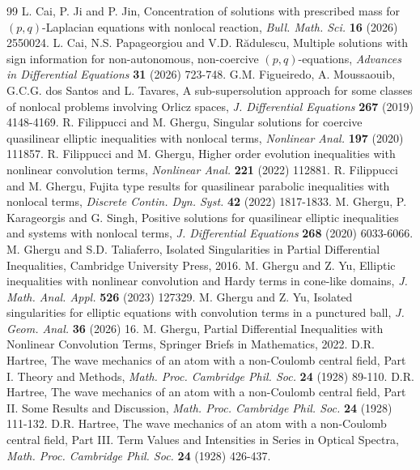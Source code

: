 \documentclass[10pt,a4paper]{amsart}
\numberwithin{equation}{section}
\begin{document}
\begin{thebibliography}{99}
 L. Cai, P. Ji and P. Jin, Concentration of solutions with prescribed mass for $(p,q)$-Laplacian equations with nonlocal reaction, {\it Bull. Math. Sci.} {\bf 16} (2026) 2550024.
 L. Cai, N.S. Papageorgiou and V.D. R\u adulescu, Multiple solutions with sign information for non-autonomous, non-coercive $(p,q)$-equations, {\it Advances in Differential Equations} {\bf 31} (2026) 723-748.
 G.M. Figueiredo, A. Moussaouib, G.C.G. dos Santos and L. Tavares, A sub-supersolution approach for some classes of nonlocal problems involving Orlicz spaces, {\it J. Differential Equations} {\bf 267} (2019) 4148-4169.
 R. Filippucci and M. Ghergu, Singular solutions for coercive quasilinear elliptic inequalities with nonlocal terms, {\it Nonlinear Anal.} {\bf 197} (2020) 111857.
 R. Filippucci and M. Ghergu, Higher order evolution inequalities with nonlinear convolution terms, {\it Nonlinear Anal.} {\bf 221} (2022) 112881.
 R. Filippucci and M. Ghergu, Fujita type results for quasilinear parabolic inequalities with nonlocal terms, {\it Discrete Contin. Dyn. Syst.} {\bf 42} (2022) 1817-1833.
 M. Ghergu, P. Karageorgis and G. Singh, Positive solutions for quasilinear elliptic inequalities and systems with nonlocal terms, {\it J. Differential Equations} {\bf 268} (2020) 6033-6066.
 M. Ghergu and S.D. Taliaferro, Isolated Singularities in Partial Differential Inequalities, Cambridge University Press, 2016.
 M. Ghergu and Z. Yu, Elliptic inequalities with nonlinear convolution and Hardy terms in cone-like domains, {\it J. Math. Anal. Appl.} {\bf 526} (2023) 127329.
 M. Ghergu and Z. Yu, Isolated singularities for elliptic equations with convolution terms in a punctured ball, {\it J. Geom. Anal.} {\bf 36} (2026) 16.
 M. Ghergu, Partial Differential Inequalities with Nonlinear Convolution Terms, Springer Briefs in Mathematics, 2022.
 D.R. Hartree, The wave mechanics of an atom with a non-Coulomb central field, Part I. Theory and Methods, {\it Math. Proc. Cambridge Phil. Soc.} {\bf 24} (1928) 89-110.
 D.R. Hartree, The wave mechanics of an atom with a non-Coulomb central field, Part II. Some Results and Discussion, {\it Math. Proc. Cambridge Phil. Soc.} {\bf 24} (1928) 111-132.
 D.R. Hartree, The wave mechanics of an atom with a non-Coulomb central field, Part III. Term Values and Intensities in Series in Optical Spectra, {\it Math. Proc. Cambridge Phil. Soc.} {\bf 24} (1928) 426-437.

\end{thebibliography}
\end{document}
